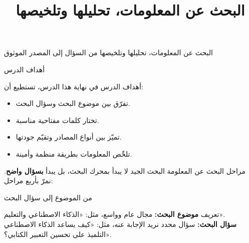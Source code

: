 \documentclass[aspectratio=169, 11pt, xcolor={table}]{beamer}
\title{البحث عن المعلومات، تحليلها وتلخيصها}
\begin{document}
{البحث عن المعلومات، تحليلها وتلخيصها}
{من السؤال إلى المصدر الموثوق}

\begin{frame}{أهداف الدرس}
    \begin{tbox}{\faBullseye\quad أهداف الدرس}
        في نهاية هذا الدرس، تستطيع أن:
        \begin{itemize}
            \item تفرّق بين موضوع البحث وسؤال البحث.
            \item تختار كلمات مفتاحية مناسبة.
            \item تميّز بين أنواع المصادر وتقيّم جودتها.
            \item تلخّص المعلومات بطريقة منظمة وأمينة.
        \end{itemize}
    \end{tbox}
\end{frame}

\begin{frame}{مراحل البحث عن المعلومة}
    البحث الجيد لا يبدأ بمحرك البحث، بل يبدأ \textbf{بسؤال واضح}.
    نمرّ بأربع مراحل:
    \begin{center}
    \end{center}
\end{frame}

\begin{frame}{من الموضوع إلى سؤال البحث}
    \begin{tbox}{\faLightbulb\quad تعريف}
        \textbf{موضوع البحث:} مجال عام وواسع، مثل: «الذكاء الاصطناعي والتعليم».\\[2pt]
        \textbf{سؤال البحث:} سؤال محدد نريد الإجابة عنه، مثل:
        «كيف يساعد الذكاء الاصطناعي التلميذ على تحسين التعبير الكتابي؟».
    \end{tbox}
    \begin{center}
    \end{center}
\end{frame}
\end{document}

